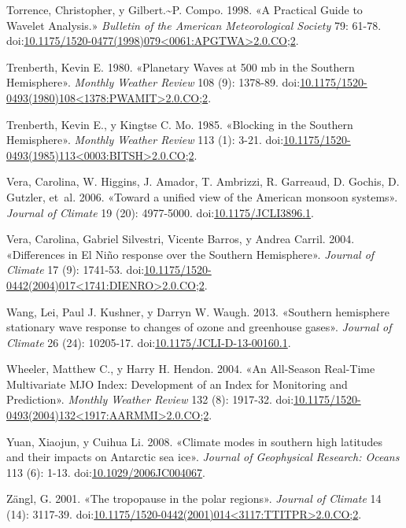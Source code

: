\documentclass[spanish,a4paper,12p]{book}
\begin{document}
\hypertarget{ref-Torrence1998}{}
Torrence, Christopher, y Gilbert.\textasciitilde{}P. Compo. 1998. «A
Practical Guide to Wavelet Analysis.» \emph{Bulletin of the American
Meteorological Society} 79: 61-78.
doi:\href{https://doi.org/10.1175/1520-0477(1998)079\%3C0061:APGTWA\%3E2.0.CO;2}{10.1175/1520-0477(1998)079\textless{}0061:APGTWA\textgreater{}2.0.CO;2}.

\hypertarget{ref-Trenberth1980a}{}
Trenberth, Kevin E. 1980. «Planetary Waves at 500 mb in the Southern
Hemisphere». \emph{Monthly Weather Review} 108 (9): 1378-89.
doi:\href{https://doi.org/10.1175/1520-0493(1980)108\%3C1378:PWAMIT\%3E2.0.CO;2}{10.1175/1520-0493(1980)108\textless{}1378:PWAMIT\textgreater{}2.0.CO;2}.

\hypertarget{ref-Trenberth1985}{}
Trenberth, Kevin E., y Kingtse C. Mo. 1985. «Blocking in the Southern
Hemisphere». \emph{Monthly Weather Review} 113 (1): 3-21.
doi:\href{https://doi.org/10.1175/1520-0493(1985)113\%3C0003:BITSH\%3E2.0.CO;2}{10.1175/1520-0493(1985)113\textless{}0003:BITSH\textgreater{}2.0.CO;2}.

\hypertarget{ref-Vera2006}{}
Vera, Carolina, W. Higgins, J. Amador, T. Ambrizzi, R. Garreaud, D.
Gochis, D. Gutzler, et~al. 2006. «Toward a unified view of the American
monsoon systems». \emph{Journal of Climate} 19 (20): 4977-5000.
doi:\href{https://doi.org/10.1175/JCLI3896.1}{10.1175/JCLI3896.1}.

\hypertarget{ref-Vera2004}{}
Vera, Carolina, Gabriel Silvestri, Vicente Barros, y Andrea Carril.
2004. «Differences in El Niño response over the Southern Hemisphere».
\emph{Journal of Climate} 17 (9): 1741-53.
doi:\href{https://doi.org/10.1175/1520-0442(2004)017\%3C1741:DIENRO\%3E2.0.CO;2}{10.1175/1520-0442(2004)017\textless{}1741:DIENRO\textgreater{}2.0.CO;2}.

\hypertarget{ref-Wang2013}{}
Wang, Lei, Paul J. Kushner, y Darryn W. Waugh. 2013. «Southern
hemisphere stationary wave response to changes of ozone and greenhouse
gases». \emph{Journal of Climate} 26 (24): 10205-17.
doi:\href{https://doi.org/10.1175/JCLI-D-13-00160.1}{10.1175/JCLI-D-13-00160.1}.

\hypertarget{ref-Wheeler2004}{}
Wheeler, Matthew C., y Harry H. Hendon. 2004. «An All-Season Real-Time
Multivariate MJO Index: Development of an Index for Monitoring and
Prediction». \emph{Monthly Weather Review} 132 (8): 1917-32.
doi:\href{https://doi.org/10.1175/1520-0493(2004)132\%3C1917:AARMMI\%3E2.0.CO;2}{10.1175/1520-0493(2004)132\textless{}1917:AARMMI\textgreater{}2.0.CO;2}.

\hypertarget{ref-Yuan2008}{}
Yuan, Xiaojun, y Cuihua Li. 2008. «Climate modes in southern high
latitudes and their impacts on Antarctic sea ice». \emph{Journal of
Geophysical Research: Oceans} 113 (6): 1-13.
doi:\href{https://doi.org/10.1029/2006JC004067}{10.1029/2006JC004067}.

\hypertarget{ref-Zangl2001}{}
Zängl, G. 2001. «The tropopause in the polar regions». \emph{Journal of
Climate} 14 (14): 3117-39.
doi:\href{https://doi.org/10.1175/1520-0442(2001)014\%3C3117:TTITPR\%3E2.0.CO;2}{10.1175/1520-0442(2001)014\textless{}3117:TTITPR\textgreater{}2.0.CO;2}.
\end{document}
